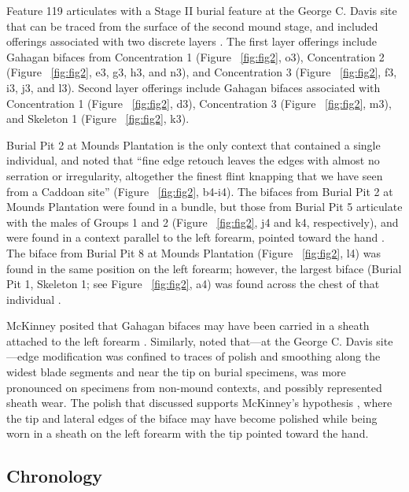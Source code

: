 \documentclass[review]{elsarticle}
\begin{document}
Feature 119 \citep[Figure 13-18]{RN808} articulates with a Stage II burial feature at the George C. Davis site that can be traced from the surface of the second mound stage, and included offerings associated with two discrete layers \citep{RN808,RN5050,RN806}. The first layer offerings include Gahagan bifaces from Concentration 1 (Figure ~\ref{fig:fig2}, o3), Concentration 2 (Figure ~\ref{fig:fig2}, e3, g3, h3, and n3), and Concentration 3 (Figure ~\ref{fig:fig2}, f3, i3, j3, and l3). Second layer offerings include Gahagan bifaces associated with Concentration 1 (Figure ~\ref{fig:fig2}, d3), Concentration 3 (Figure ~\ref{fig:fig2}, m3), and Skeleton 1 (Figure ~\ref{fig:fig2}, k3). 

Burial Pit 2 at Mounds Plantation is the only context that contained a single individual, and \citet[97]{RN11561} noted that “fine edge retouch leaves the edges with almost no serration or irregularity, altogether the finest flint knapping that we have seen from a Caddoan site” (Figure ~\ref{fig:fig2}, b4-i4). The bifaces from Burial Pit 2 at Mounds Plantation were found in a bundle, but those from Burial Pit 5 articulate with the males of Groups 1 and 2 (Figure ~\ref{fig:fig2}, j4 and k4, respectively), and were found in a context parallel to the left forearm, pointed toward the hand \citep[Figure 5]{RN11561}. The biface from Burial Pit 8 at Mounds Plantation (Figure ~\ref{fig:fig2}, l4) was found in the same position on the left forearm; however, the largest biface (Burial Pit 1, Skeleton 1; see Figure ~\ref{fig:fig2}, a4) was found across the chest of that individual \citep{RN11561}.

McKinney posited that Gahagan bifaces may have been carried in a sheath attached to the left forearm \citep{RN11561}. Similarly, \citet{RN3684} noted that---at the George C. Davis site---edge modification was confined to traces of polish and smoothing along the widest blade segments and near the tip on burial specimens, was more pronounced on specimens from non-mound contexts, and possibly represented sheath wear. The polish that \citet{RN3684} discussed supports McKinney’s hypothesis \citep{RN11561}, where the tip and lateral edges of the biface may have become polished while being worn in a sheath on the left forearm with the tip pointed toward the hand.

\subsection*{Chronology}
\end{document}
